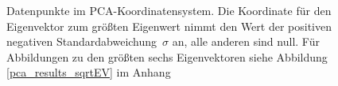 \begin{figure}[h]
   \qquad
   
   \caption{Datenpunkte im PCA-Koordinatensystem. Die Koordinate für den Eigenvektor zum größten Eigenwert nimmt den Wert der positiven \bzw negativen \mbox{Standardabweichung $\sigma$} an, alle anderen sind null. Für Abbildungen zu den größten sechs Eigenvektoren siehe Abbildung \ref{pca_results_sqrtEV} im Anhang}
   \label{pca_results_sqrtEV_biggest}
 \end{figure}

